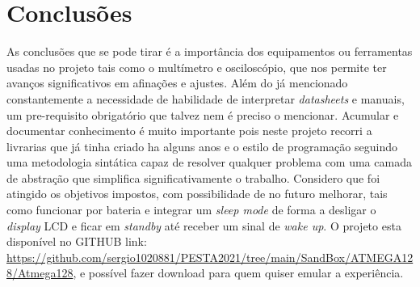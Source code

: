 \section{Conclusões}
\begin{frame}
	As conclusões que se pode tirar é a importância dos equipamentos ou ferramentas usadas no projeto tais como o multímetro e osciloscópio, que nos permite ter avanços significativos em afinações e ajustes. Além do já mencionado constantemente a necessidade de habilidade de interpretar \textit{datasheets} e manuais, um pre-requisito obrigatório que talvez nem é preciso o mencionar.
	\newline
	Acumular e documentar conhecimento é muito importante pois neste projeto recorri a livrarias que já tinha criado ha alguns anos e o estilo de programação seguindo uma metodologia sintática capaz de resolver qualquer problema com uma camada de abstração que simplifica significativamente o trabalho. 
	\newline
	\newline
	Considero que foi atingido os objetivos impostos, com possibilidade de no futuro melhorar, tais como funcionar por bateria e integrar um \textit{sleep mode} de forma a desligar o \textit{display} LCD e ficar em \textit{standby} até receber um sinal de \textit{wake up}.
	\newline
	\newline
	O projeto esta disponível no GITHUB link: \url{https://github.com/sergio1020881/PESTA2021/tree/main/SandBox/ATMEGA128/Atmega128}, e possível fazer download para quem quiser emular a experiência.
\end{frame}
